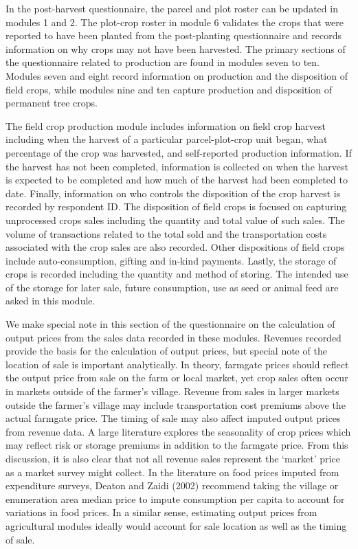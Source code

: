 \documentclass[
]{book}
\begin{document}
In the post-harvest questionnaire, the parcel and plot roster can be updated in modules 1 and 2. The plot-crop roster in module 6 validates the crops that were reported to have been planted from the post-planting questionnaire and records information on why crops may not have been harvested. The primary sections of the questionnaire related to production are found in modules seven to ten. Modules seven and eight record information on production and the disposition of field crops, while modules nine and ten capture production and disposition of permanent tree crops.

The field crop production module includes information on field crop harvest including when the harvest of a particular parcel-plot-crop unit began, what percentage of the crop was harvested, and self-reported production information. If the harvest has not been completed, information is collected on when the harvest is expected to be completed and how much of the harvest had been completed to date. Finally, information on who controls the disposition of the crop harvest is recorded by respondent ID. The disposition of field crops is focused on capturing unprocessed crops sales including the quantity and total value of such sales. The volume of transactions related to the total sold and the transportation costs associated with the crop sales are also recorded. Other dispositions of field crops include auto-consumption, gifting and in-kind payments. Lastly, the storage of crops is recorded including the quantity and method of storing. The intended use of the storage for later sale, future consumption, use as seed or animal feed are asked in this module.

We make special note in this section of the questionnaire on the calculation of output prices from the sales data recorded in these modules. Revenues recorded provide the basis for the calculation of output prices, but special note of the location of sale is important analytically. In theory, farmgate prices should reflect the output price from sale on the farm or local market, yet crop sales often occur in markets outside of the farmer's village. Revenue from sales in larger markets outside the farmer's village may include transportation cost premiums above the actual farmgate price. The timing of sale may also affect imputed output prices from revenue data. A large literature explores the seasonality of crop prices which may reflect risk or storage premiums in addition to the farmgate price. From this discussion, it is also clear that not all revenue sales represent the `market' price as a market survey might collect. In the literature on food prices imputed from expenditure surveys, Deaton and Zaidi (2002) recommend taking the village or enumeration area median price to impute consumption per capita to account for variations in food prices. In a similar sense, estimating output prices from agricultural modules ideally would account for sale location as well as the timing of sale.
\end{document}
